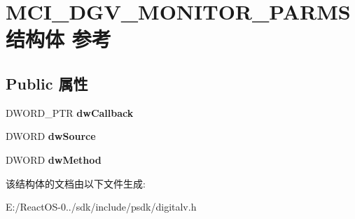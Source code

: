 \hypertarget{struct_m_c_i___d_g_v___m_o_n_i_t_o_r___p_a_r_m_s}{}\section{M\+C\+I\+\_\+\+D\+G\+V\+\_\+\+M\+O\+N\+I\+T\+O\+R\+\_\+\+P\+A\+R\+M\+S结构体 参考}
\label{struct_m_c_i___d_g_v___m_o_n_i_t_o_r___p_a_r_m_s}
\subsection*{Public 属性}
\begin{DoxyCompactItemize}
\item 
\mbox{\label{struct_m_c_i___d_g_v___m_o_n_i_t_o_r___p_a_r_m_s_a96b16a1f32289d703b4eed6ec69f8884}} 
D\+W\+O\+R\+D\+\_\+\+P\+TR {\bfseries dw\+Callback}
\item 
\mbox{\label{struct_m_c_i___d_g_v___m_o_n_i_t_o_r___p_a_r_m_s_a55ebd9c8bf07ade6a176054a1042cd5e}} 
D\+W\+O\+RD {\bfseries dw\+Source}
\item 
\mbox{\label{struct_m_c_i___d_g_v___m_o_n_i_t_o_r___p_a_r_m_s_aff800856c2fc422b2efb596047f69007}} 
D\+W\+O\+RD {\bfseries dw\+Method}
\end{DoxyCompactItemize}


该结构体的文档由以下文件生成\+:\begin{DoxyCompactItemize}
\item 
E\+:/\+React\+O\+S-\/0../sdk/include/psdk/digitalv.\+h\end{DoxyCompactItemize}
